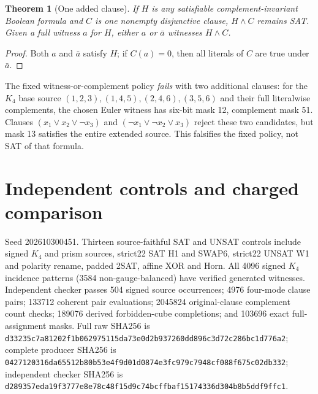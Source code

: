 \documentclass[10pt]{article}
\newtheorem{theorem}{Theorem}
\begin{document}
\begin{theorem}[One added clause]
If $H$ is any satisfiable complement-invariant Boolean formula and $C$ is one nonempty disjunctive clause, $H\land C$ remains SAT. Given a full witness $a$ for $H$, either $a$ or $\bar a$ witnesses $H\land C$.
\end{theorem}
\begin{proof}
Both $a$ and $\bar a$ satisfy $H$; if $C(a)=0$, then all literals of $C$ are true under $\bar a$.
\end{proof}
The fixed witness-or-complement policy \emph{fails} with two additional clauses: for the $K_4$ base source $(1,2,3),(1,4,5),(2,4,6),(3,5,6)$ and their full literalwise complements, the chosen Euler witness has six-bit mask 12, complement mask 51. Clauses $(x_1\vee x_2\vee\neg x_3)$ and $(\neg x_1\vee\neg x_2\vee x_3)$ reject these two candidates, but mask 13 satisfies the entire extended source. This falsifies the fixed policy, not SAT of that formula.

\section{Independent controls and charged comparison}
Seed 202610300451. Thirteen source-faithful SAT and UNSAT controls include signed $K_4$ and prism sources, strict22 SAT H1 and SWAP6, strict22 UNSAT W1 and polarity rename, padded 2SAT, affine XOR and Horn. All 4096 signed $K_4$ incidence patterns (3584 non-gauge-balanced) have verified generated witnesses. Independent checker passes 504 signed source occurrences; 4976 four-mode clause pairs; 133712 coherent pair evaluations; 2045824 original-clause complement count checks; 189076 derived forbidden-cube completions; and 103696 exact full-assignment masks. Full raw SHA256 is \texttt{d33235c7a81202f1b062975115da73e0d2b937260dd896c3d72c286bc1d776a2}; complete producer SHA256 is \texttt{0427120316da65512b80b53e4f9d01d0874e3fc979c7948cf088f675c02db332}; independent checker SHA256 is \texttt{d289357eda19f3777e8e78c48f15d9c74bcffbaf15174336d304b8b5ddf9ffc1}.
\end{document}
